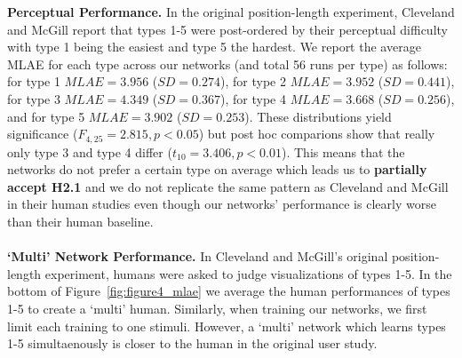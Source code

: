 \noindent\textbf{Perceptual Performance.} In the original position-length experiment, Cleveland and McGill report that types 1-5 were post-ordered by their perceptual difficulty with type 1 being the easiest and type 5 the hardest. We report the average MLAE for each type across our networks (and total 56 runs per type) as follows: 
for type 1 $MLAE= 3.956 $ ($SD= 0.274 $),
for type 2 $MLAE= 3.952 $ ($SD= 0.441 $),
for type 3  $MLAE= 4.349 $ ($SD= 0.367 $),
for type 4 $MLAE= 3.668 $ ($SD= 0.256 $), and 
for type 5 $MLAE= 3.902 $ ($SD= 0.253 $). These distributions yield significance ($F_{4,25}=2.815, p<0.05$) but post hoc comparions show that really only type 3 and type 4 differ ($t_{10}=3.406, p<0.01$). This means that the networks do not prefer a certain type on average which leads us to \textbf{partially accept H2.1} and we do not replicate the same pattern as Cleveland and McGill in their human studies even though our networks' performance is clearly worse than their human baseline.
\\~\\
\noindent\textbf{`Multi' Network Performance.} In Cleveland and McGill's original position-length experiment, humans were asked to judge visualizations of types 1-5. In the bottom of Figure~\ref{fig:figure4_mlae} we average the human performances of types 1-5 to create a `multi' human. Similarly, when training our networks, we first limit each training to one stimuli. However, a `multi' network which learns types 1-5 simultaenously is closer to the human in the original user study. 


